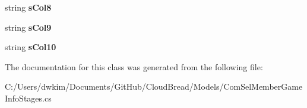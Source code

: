 \begin{DoxyCompactItemize}
\item 
string {\bfseries s\+Col8}\hypertarget{a00061_a56081d4d74fbc17f410fdce153488b50}{}\label{a00061_a56081d4d74fbc17f410fdce153488b50}

\item 
string {\bfseries s\+Col9}\hypertarget{a00061_ae25308b999c686878148af0efe48186f}{}\label{a00061_ae25308b999c686878148af0efe48186f}

\item 
string {\bfseries s\+Col10}\hypertarget{a00061_a6bde81e4654e4a36317bb16eeb9fdb18}{}\label{a00061_a6bde81e4654e4a36317bb16eeb9fdb18}

\end{DoxyCompactItemize}


The documentation for this class was generated from the following file\+:\begin{DoxyCompactItemize}
\item 
C\+:/\+Users/dwkim/\+Documents/\+Git\+Hub/\+Cloud\+Bread/\+Models/Com\+Sel\+Member\+Game\+Info\+Stages.\+cs\end{DoxyCompactItemize}
